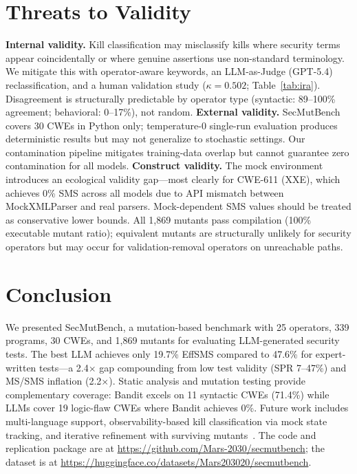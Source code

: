 \documentclass[sigconf,anonymous,review]{acmart}
\begin{document}
\section{Threats to Validity}\label{sec:threats}

\textbf{Internal validity.} Kill classification may misclassify kills where security terms appear coincidentally or where genuine assertions use non-standard terminology. We mitigate this with operator-aware keywords, an LLM-as-Judge (GPT-5.4) reclassification, and a human validation study ($\kappa = 0.502$; Table~\ref{tab:ira}). Disagreement is structurally predictable by operator type (syntactic: 89--100\% agreement; behavioral: 0--17\%), not random.
%
\textbf{External validity.} SecMutBench covers 30 CWEs in Python only; temperature-0 single-run evaluation produces deterministic results but may not generalize to stochastic settings. Our contamination pipeline mitigates training-data overlap but cannot guarantee zero contamination for all models.
%
\textbf{Construct validity.} The mock environment introduces an ecological validity gap---most clearly for CWE-611 (XXE), which achieves 0\% SMS across all models due to API mismatch between MockXMLParser and real parsers. Mock-dependent SMS values should be treated as conservative lower bounds. All 1,869 mutants pass compilation (100\% executable mutant ratio); equivalent mutants are structurally unlikely for security operators but may occur for validation-removal operators on unreachable paths.




\section{Conclusion}\label{sec:conclusion}

We presented SecMutBench, a mutation-based benchmark with 25 operators, 339 programs, 30 CWEs, and 1,869 mutants for evaluating LLM-generated security tests. The best LLM achieves only 19.7\% EffSMS compared to 47.6\% for expert-written tests---a 2.4$\times$ gap compounding from low test validity (SPR 7--47\%) and MS/SMS inflation (2.2$\times$). Static analysis and mutation testing provide complementary coverage: Bandit excels on 11 syntactic CWEs (71.4\%) while LLMs cover 19 logic-flaw CWEs where Bandit achieves 0\%. Future work includes multi-language support, observability-based kill classification via mock state tracking, and iterative refinement with surviving mutants~\cite{dakhel2023mutap,mutgen2025}. The code and replication package are at \url{https://github.com/Mars-2030/secmutbench}; the dataset is at \url{https://huggingface.co/datasets/Mars203020/secmutbench}.
\end{document}
